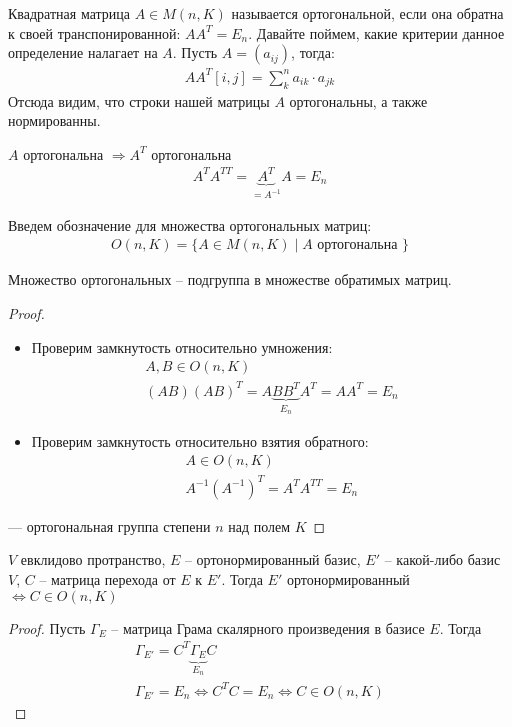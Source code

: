 Квадратная матрица $A \in M(n, K)$ называется ортогональной, если она обратна к своей транспонированной: $AA^T = E_n$. 
Давайте поймем, какие критерии данное определение налагает на $A$. Пусть $A = (a_{ij})$, тогда: 
\begin{gather*}
    AA^T [i, j] = \sum\limits_{k}^n a_{i k} \cdot a_{jk}
\end{gather*}
Отсюда видим, что строки нашей матрицы $A$ ортогональны, а также нормированны.
\begin{lemma}
    $A$ ортогональна $\Longrightarrow A^T$ ортогональна
    \begin{gather*}
        A^T A^{TT} = \underbrace{A^T}_{= A^{-1}} A = E_n
    \end{gather*}
\end{lemma}
\begin{conj}
    Введем обозначение для множества ортогональных матриц: 
    \begin{gather*}
        O(n, K) = \{ A \in M(n, K) \mid A \text{ ортогональна } \}
    \end{gather*}
\end{conj}
\begin{theorem-non}
    Множество ортогональных -- подгруппа в множестве обратимых матриц.
\end{theorem-non}
\begin{proof} \quad 

    \begin{itemize}
        \item Проверим замкнутость относительно умножения: 
            \begin{gather*}
                A, B \in O(n, K) \\
                (AB)(AB)^T = A\underbrace{B B^T}_{E_n} A^T = A A^T = E_n 
            \end{gather*}
        \item Проверим замкнутость относительно взятия обратного: 
            \begin{gather*}
                A \in O(n, K) \\
                A^{-1} (A^{-1})^T = A^T A^{TT} = E_n
            \end{gather*}
    \end{itemize}
    --- ортогональная группа степени $n$ над полем $K$
\end{proof}

\begin{theorem-non}
    $V$ евклидово протранство, $E$ -- ортонормированный базис, $E'$ -- какой-либо базис $V$,
    $C$ -- матрица перехода от $E$ к $E'$. Тогда $E'$ ортонормированный $\Longleftrightarrow C \in O(n, K)$ 
\end{theorem-non}
\begin{proof}
    Пусть $\Gamma_E$ -- матрица Грама скалярного произведения в базисе $E$. Тогда
    \begin{gather*}
        \Gamma_{E'} = C^T \underbrace{\Gamma_E}_{E_n} C \\ 
        \Gamma_{E'} = E_n \Longleftrightarrow C^T C = E_n \Longleftrightarrow C \in O(n, K)
    \end{gather*} 
\end{proof}